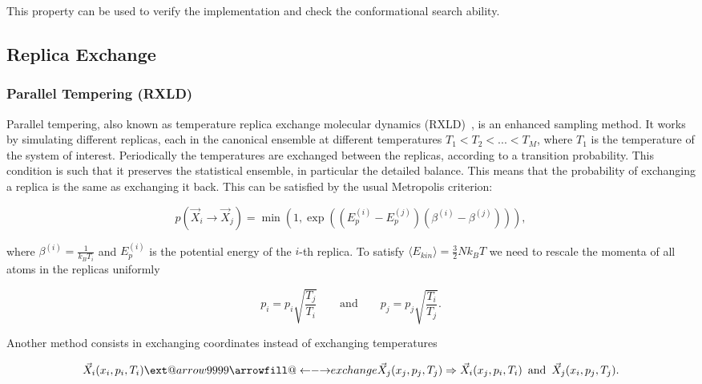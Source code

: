 \documentclass[a4paper]{article}
\makeatletter
\newcommand\xleftrightarrow[2][]{%
  \ext@arrow 9999{\longleftrightarrowfill@}{#1}{#2}}
\newcommand\longleftrightarrowfill@{%
  \arrowfill@\leftarrow\relbar\rightarrow}
\makeatother
\begin{document}
This property can be used to verify the implementation and check the conformational search ability.

\subsection{Replica Exchange}

\subsubsection{Parallel Tempering (RXLD)}

Parallel tempering, also known as temperature replica exchange molecular dynamics (RXLD)~\cite{YujiSugita1999}, is an enhanced sampling method. It works by simulating different replicas, each in the canonical ensemble at different temperatures $T_1 < T_2 < ... < T_M$, where $T_1$ is the temperature of the system of interest. Periodically the temperatures are exchanged between the replicas, according to a transition probability. This condition is such that it preserves the statistical ensemble, in particular the detailed balance. This means that the probability of exchanging a replica is the same as exchanging it back. This can be satisfied by the usual Metropolis criterion:

\begin{equation}
p \left( \vec{X}_i \rightarrow \vec{X}_j \right) = \min \left( 1, \exp \left( \left( E_p^{(i)} - E_p^{(j)} \right)  \left( \beta^{(i)} - \beta^{(j)} \right)  \right) \right),
\label{eq:parallel}
\end{equation}

where $\beta^{(i)} = \frac{1}{k_B T_i}$ and $E_p^{(i)}$ is the potential energy of the $i$-th replica. To satisfy $\langle E_{kin} \rangle = \frac{3}{2} N k_B T$ we need to rescale the momenta of all atoms in the replicas uniformly

\begin{equation}
p_i = p_i \sqrt{\frac{T_j}{T_i}} \qquad \text{and} \qquad p_j = p_j \sqrt{\frac{T_i}{T_j}}.
\end{equation}

Another method consists in  exchanging coordinates instead of exchanging temperatures

\begin{equation}
\vec{X}_i(x_i, p_i, T_i) \xleftrightarrow{exchange} \vec{X}_j(x_j, p_j, T_j) \Rightarrow \vec{X}_i(x_j, p_i, T_i) \enspace \text{and} \enspace \vec{X}_j(x_i, p_j, T_j).
\end{equation}
\end{document}
